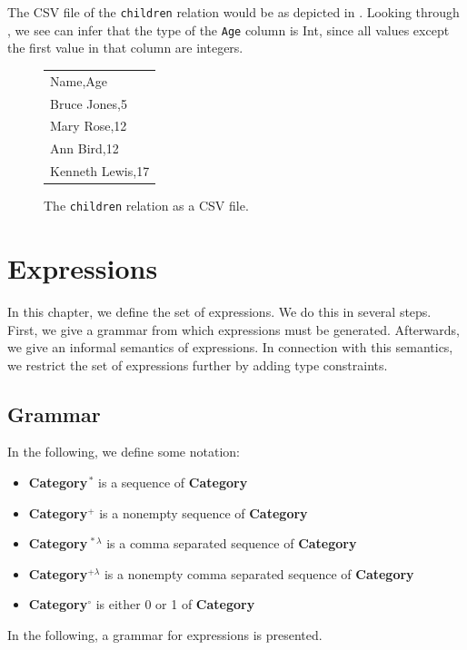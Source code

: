 \documentclass[a4,14pt,latin1]{article}
\begin{document}

The CSV file of the {\tt children} relation would be as depicted in
. Looking through , we
see \RAS{} can infer that the type of the {\tt Age} column is {\sc
  Int}, since all values except the first value in that column are
integers.

\begin{figure}[hp]
  \begin{center}
    \begin{tabular}{l}
      Name,Age\\
      Bruce Jones,5\\
      Mary Rose,12\\
      Ann Bird,12\\
      Kenneth Lewis,17
    \end{tabular}
  \end{center}
  \caption{The {\tt children} relation as a CSV file.}
  \label{childrencsv}
\end{figure}


\clearpage
\section{Expressions}
\label{expressions}
In this chapter, we define the set of \RAS{} expressions. We do this
in several steps. First, we give a grammar from which expressions must
be generated. Afterwards, we give an informal semantics of \RAS{}
expressions.  In connection with this semantics, we restrict the set
of expressions further by adding type constraints.

\subsection{Grammar}
In the following, we define some notation:
\begin{itemize}
\item {\bf Category}$^{\displaystyle \,*}$ is a sequence of {\bf Category}
\item {\bf Category}$^{\displaystyle +}$ is a nonempty sequence of
                                                            {\bf Category}
\item {\bf Category}$^{\displaystyle \,*\lambda}$ is a comma separated sequence
                                                         of {\bf Category}
\item {\bf Category}$^{\displaystyle +\lambda}$ is a nonempty comma separated
                                                sequence of {\bf Category}
\item {\bf Category}$^{\displaystyle \circ}$ is either 0 or 1 of
                                                            {\bf Category}
\end{itemize}
In the following, a grammar for \RAS{} expressions is presented.
\end{document}
